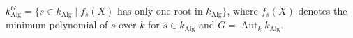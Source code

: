 $k_{\text{Alg}}^G = \{s \in k_{\text{Alg}} \mid f_s(X) \text{ has only one root in } k_{\text{Alg}}\}$, where $f_s(X)$ denotes the minimum polynomial of $s$ over $k$ for $s \in k_{\text{Alg}}$ and $G = \operatorname{Aut}_k k_{\text{Alg}}$.
